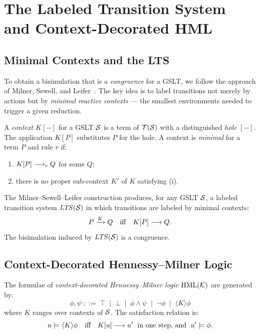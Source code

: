\chapter{The Labeled Transition System and Context-Decorated HML}
\label{sec:lts-hml}

\section{Minimal Contexts and the LTS}

To obtain a bisimulation that is a \emph{congruence} for a GSLT, we follow
the approach of Milner, Sewell, and Leifer~\cite{leifer2000deriving}.
The key idea is to label transitions not merely by actions but by
\emph{minimal reactive contexts} --- the smallest environments needed to
trigger a given reduction.

\begin{definition}[Context]
A \emph{context} $K[-]$ for a GSLT $\mathcal{S}$ is a term of $\mathcal{T}(\mathcal{S})$
with a distinguished \emph{hole} $[-]$.  The application $K[P]$ substitutes
$P$ for the hole.  A context is \emph{minimal} for a term $P$ and rule $r$ if:
\begin{enumerate}[label=(\roman*)]
  \item $K[P] \longrightarrow_r Q$ for some $Q$;
  \item there is no proper sub-context $K'$ of $K$ satisfying (i).
\end{enumerate}
\end{definition}

The Milner--Sewell--Leifer construction produces, for any GSLT $\mathcal{S}$, a
labeled transition system $\mathit{LTS}(\mathcal{S})$ in which transitions are labeled by
minimal contexts:
\[
  P \xrightarrow{K} Q \quad\text{iff}\quad K[P] \longrightarrow Q.
\]
The bisimulation induced by $\mathit{LTS}(\mathcal{S})$ is a congruence.

\section{Context-Decorated Hennessy--Milner Logic}

\begin{definition}
\label{def:cdHML}
The formulae of \emph{context-decorated Hennessy--Milner logic}
$\mathrm{HML}(\mathcal{K})$ are generated by:
\[
  \phi, \psi \;::=\; \top \;\mid\; \bot \;\mid\; \phi \wedge \psi \;\mid\;
  \neg\phi \;\mid\; \langle K \rangle \phi
\]
where $K$ ranges over contexts of $\mathcal{S}$.
The satisfaction relation is:
\[
  u \models \langle K \rangle \phi \quad\text{iff}\quad
  K[u] \longrightarrow u' \;\text{ in one step, and }\; u' \models \phi.
\]
\end{definition}

